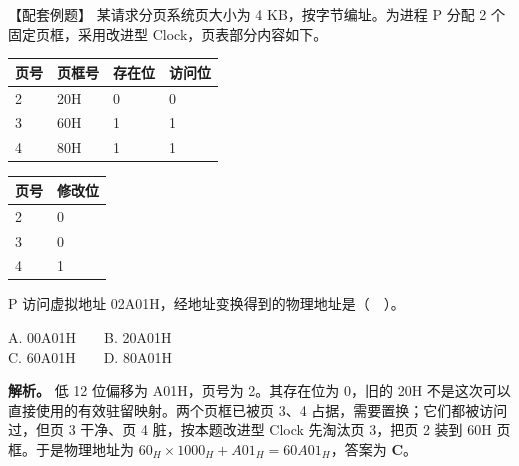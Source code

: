 \begin{example}[配套例题]

【配套例题】 某请求分页系统页大小为 4 KB，按字节编址。为进程 P 分配 2 个固定页框，采用改进型 Clock，页表部分内容如下。

\begin{wideblock}

\par\medskip\noindent\begin{minipage}{\linewidth}\fontsize{9.3}{12}\selectfont\begin{tabularx}{\linewidth}{@{}YYYY@{}}
\toprule\noalign{}
页号 & 页框号 & 存在位 & 访问位 \\
\midrule\noalign{}


2 & 20H & 0 & 0 \\
3 & 60H & 1 & 1 \\
4 & 80H & 1 & 1 \\
\bottomrule\end{tabularx}
\end{minipage}\par\medskip

\end{wideblock}

\begin{wideblock}

\par\medskip\noindent\begin{minipage}{\linewidth}\fontsize{9.3}{12}\selectfont\begin{tabularx}{\linewidth}{@{}YY@{}}
\toprule\noalign{}
页号 & 修改位 \\
\midrule\noalign{}


2 & 0 \\
3 & 0 \\
4 & 1 \\
\bottomrule\end{tabularx}
\end{minipage}\par\medskip

\end{wideblock}

P 访问虚拟地址 02A01H，经地址变换得到的物理地址是（　）。

A. 00A01H　　B. 20A01H\\
C. 60A01H　　D. 80A01H

\end{example}

\textbf{解析。} 低 12 位偏移为 A01H，页号为 2。其存在位为 0，旧的 20H 不是这次可以直接使用的有效驻留映射。两个页框已被页 3、4 占据，需要置换；它们都被访问过，但页 3 干净、页 4 脏，按本题改进型 Clock 先淘汰页 3，把页 2 装到 60H 页框。于是物理地址为 \(60_H\times1000_H+A01_H=60A01_H\)，答案为 \textbf{C}。

